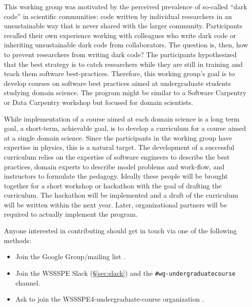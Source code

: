 \documentclass[11pt, oneside]{amsart}
\newcommand{\note}[1]{ {\textcolor{blueish}    { ***Note:      #1 }}}
\begin{document}

This working group was motivated by the perceived prevalence of
so-called ``dark code'' in scientific communities: code written by
individual researchers in an unsustainable way that is never shared
with the larger community. Participants recalled their own experience
working with colleagues who write dark code or inheriting
unsustainable dark code from collaborators.
%
The question is, then, how to prevent researchers from writing dark
code? The participants hypothesized that the best strategy is to catch
researchers while they are still in training and teach them software
best-practices. Therefore, this working group's goal
is to develop courses on software best practices aimed at
undergraduate students studying domain science. The program might be
similar to a Software Carpentry or Data Carpentry workshop but
focused for domain scientists.

While implementation of a course aimed at each domain science is a long term
goal, a short-term, achievable goal, is to develop a
curriculum for a course aimed at a single domain science. Since the
participants in the working group have expertise in physics, this is a
natural target.
%
The development of a successful curriculum relies on the expertise of
software engineers to describe the best practices, domain experts to
describe model problems and work-flow, and instructors to formulate
the pedagogy. Ideally these people will be brought together for a
short workshop or hackathon with the goal of drafting the
curriculum. The
hackathon will be implemented and a draft of the curriculum will be
written within the next year.
Later, organizational partners will be required to
actually implement the program.


Anyone interested in contributing should get in touch via one of the
following methods:

\begin{itemize}
\item Join the Google Group/mailing list
  \cite{WSSSPEUndergradGoogleGroup}.
\item Join the WSSSPE Slack (\S\ref{sec:slack}) and the
  \texttt{\#wg-undergraduatecourse} channel.
\item Ask to join the WSSSPE4-undergraduate-course organization
  \cite{WSSSPEUndergradGithub}.
\end{itemize}



\end{document}
